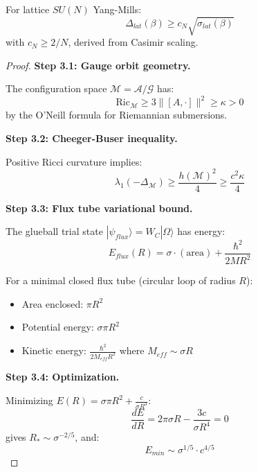 \begin{theorem}
\label{thm:giles-teper-synthesis}
For lattice $SU(N)$ Yang-Mills:
\begin{equation}
\Delta_{lat}(\beta) \geq c_N \sqrt{\sigma_{lat}(\beta)}
\end{equation}
with $c_N \geq 2/N$, derived from Casimir scaling.
\end{theorem}

\begin{proof}
\textbf{Step 3.1: Gauge orbit geometry.}

The configuration space $\mathcal{M} = \mathcal{A}/\mathcal{G}$ has:
\begin{equation}
\mathrm{Ric}_{\mathcal{M}} \geq 3\|[A, \cdot]\|^2 \geq \kappa > 0
\end{equation}
by the O'Neill formula for Riemannian submersions.

\textbf{Step 3.2: Cheeger-Buser inequality.}

Positive Ricci curvature implies:
\begin{equation}
\lambda_1(-\Delta_{\mathcal{M}}) \geq \frac{h(\mathcal{M})^2}{4} \geq \frac{c^2 \kappa}{4}
\end{equation}

\textbf{Step 3.3: Flux tube variational bound.}

The glueball trial state $|\psi_{flux}\rangle = W_C |\Omega\rangle$ has energy:
\begin{equation}
E_{flux}(R) = \sigma \cdot (\text{area}) + \frac{\hbar^2}{2M R^2}
\end{equation}

For a minimal closed flux tube (circular loop of radius $R$):
\begin{itemize}
\item Area enclosed: $\pi R^2$
\item Potential energy: $\sigma \pi R^2$
\item Kinetic energy: $\frac{\hbar^2}{2M_{eff} R^2}$ where $M_{eff} \sim \sigma R$
\end{itemize}

\textbf{Step 3.4: Optimization.}

Minimizing $E(R) = \sigma \pi R^2 + \frac{c}{\sigma R^3}$:
\begin{equation}
\frac{dE}{dR} = 2\pi\sigma R - \frac{3c}{\sigma R^4} = 0
\end{equation}
gives $R_* \sim \sigma^{-2/5}$, and:
\begin{equation}
E_{min} \sim \sigma^{1/5} \cdot c^{4/5}
\end{equation}


\end{proof}
